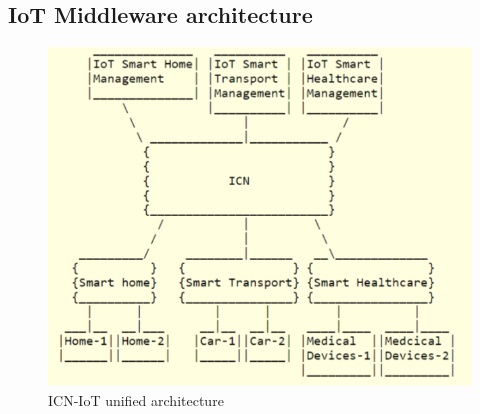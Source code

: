 \subsection{IoT Middleware architecture}
\label{subsec: IoT Middleware architecture}
 \begin{figure}[ht]
	\centering
	\includegraphics[width=0.8\linewidth]{Figures/archi.png}
	\caption[]{ICN-IoT unified architecture}
	\label{fig:archi}
\end{figure}
